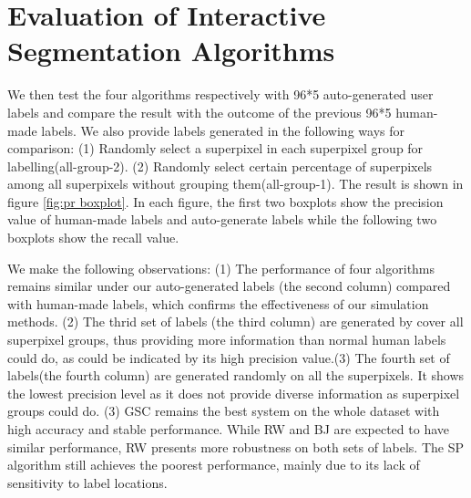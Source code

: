 \documentclass[runningheads,a4paper]{llncs}
\begin{document}
\section{Evaluation of Interactive Segmentation Algorithms}
We then test the four algorithms respectively with 96*5 auto-generated user labels and compare the result with the outcome of the previous 96*5 human-made labels. We also provide labels generated in the following ways for comparison: (1) Randomly select a superpixel in each superpixel group for labelling(all-group-2). (2) Randomly select certain percentage of superpixels among all superpixels without grouping them(all-group-1). 
The result is shown in figure \ref{fig:pr boxplot}. In each figure, the first two boxplots show the precision value of human-made labels and auto-generate labels while the following two boxplots show the recall value. 


We make the following observations: (1) The performance of four algorithms remains similar under our auto-generated labels (the second column) compared with human-made labels, which confirms the effectiveness of our simulation methods. (2) The thrid set of labels (the third column) are generated by cover all superpixel groups, thus providing more information than normal human labels could do, as could be indicated by its high precision value.(3) The fourth set of labels(the fourth column)  are generated randomly on all the superpixels. It shows the lowest precision level as it does not provide diverse information as superpixel groups could do.  (3) GSC \citep{gulshan2010geodesic} remains the best system on the whole dataset with high accuracy and stable performance. While RW \citep {grady2006random} and BJ \citep{boykov2001interactive}are expected to have similar performance, RW presents more robustness on both sets of labels. The SP\citep{bai2007geodesic} algorithm still achieves the poorest performance, mainly due to its lack of sensitivity to label locations.
\end{document}
